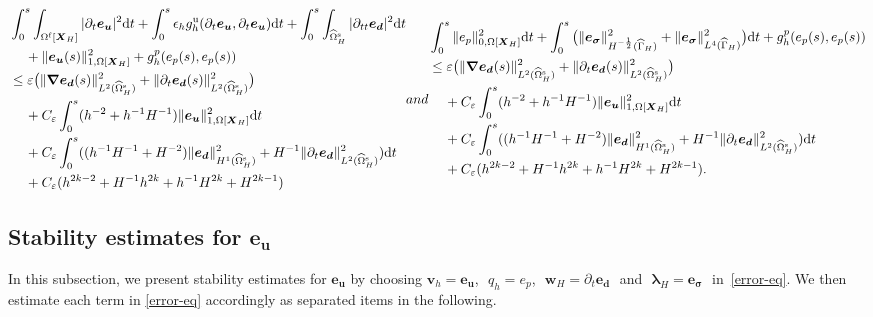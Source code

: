 \documentclass[11pt,reqno]{amsart}
\theoremstyle{definition}
\theoremstyle{plain}
\numberwithin{theorem}{section}
\numberwithin{proposition}{section}
\numberwithin{lemma}{section}
\numberwithin{equation}{section}
\newcommand{\bs}[1]{\boldsymbol{#1}}
\newcommand{\uu}[1]  {{\bs{#1}} }
\newcommand{\dep}{{{\bs{d}}}}
\newcommand{\grad}   { \uu{\nabla}    }
\def\d{\mathrm{d}}
\renewcommand{\(}{\bigl(}
\renewcommand{\)}{\bigr)}
\begin{document}
\begin{subequations}\label{ep-esigma-estimates}
\begin{align} 
& \int_0^s \int_{\Omega^{\rm f}[\bs X_H]} |\partial_t {\bs e}_{\bs u} |^2 \d t
+ \int_0^s \epsilon_h g_h^{\rm u} (\partial_t{\bs e}_{\bs u}, \partial_t{\bs e}_{\bs u}) \d t 
+ \int_0^s\int_{\widehat{\Omega}^{\rm s}_H} |\partial_{tt} {\bs e}_{\dep} |^2 \d t \notag\\
&\quad\,
+\|{\bs e}_{\bs u}(s)\|_{1,\Omega[{\bs X}_H]}^2 
+ g^p_h(e_p(s),e_p(s))\notag\\
&
\le 
\varepsilon
\big( \|\grad{\bs e}_{\bs d}(s)\|_{L^2(\widehat\Omega^{\rm s}_H)}^2 + \|\partial_t{\bs e}_{\bs d}(s)\|_{L^2(\widehat\Omega^{\rm s}_H)}^2 \big)\notag\\
&\quad\, 
+ C_\varepsilon \int_0^s (h^{-2}+h^{-1}H^{-1})\| {\bs e}_{\bs u}  \|_{1,\Omega[{\bs X}_H]}^2  \d t \notag\\
&\quad\, 
+ C_\varepsilon \int_0^s ((h^{-1}H^{-1}+H^{-2})\|{\bs e}_\dep\|_{H^1(\widehat{\Omega}^{\rm s}_H)}^2 +H^{-1}\|\partial_t{\bs e}_\dep\|_{L^2(\widehat{\Omega}^{\rm s}_H)}^2) \d t \notag\\
&\quad\, 
+ C_\varepsilon (h^{2k-2} + H^{-1}h^{2k} + h^{-1}H^{2k} + H^{2k-1}) 
\end{align}
and
\begin{align} \label{ep-esigma-estimates-L4}
& \int_0^s \| e_p \|_{0,\Omega[{\bs X}_H]}^2 \d t
+ \int_0^s \big( \| {\bs e}_{{\bs \sigma} } \|_{H^{-\frac12}(\widehat\Gamma_H)}^2 + \| {\bs e}_{\bs\sigma} \|_{L^4(\widehat\Gamma_H)}^2 \big) \d t  + g^p_h(e_p(s),e_p(s)) \notag\\
&
\le 
\varepsilon
\big( \|\grad{\bs e}_{\bs d}(s)\|_{L^2(\widehat\Omega^{\rm s}_H)}^2 + \|\partial_t{\bs e}_{\bs d}(s)\|_{L^2(\widehat\Omega^{\rm s}_H)}^2 \big)\notag\\
&\quad\, 
+ C_\varepsilon \int_0^s (h^{-2}+h^{-1}H^{-1})\| {\bs e}_{\bs u}  \|_{1,\Omega[{\bs X}_H]}^2  \d t \notag\\
&\quad\, 
+ C_\varepsilon \int_0^s ((h^{-1}H^{-1}+H^{-2})\|{\bs e}_\dep\|_{H^1(\widehat{\Omega}^{\rm s}_H)}^2 +H^{-1}\|\partial_t{\bs e}_\dep\|_{L^2(\widehat{\Omega}^{\rm s}_H)}^2) \d t \notag\\
&\quad\, 
+ C_\varepsilon (h^{2k-2} + H^{-1}h^{2k} + h^{-1}H^{2k} + H^{2k-1}) .
\end{align}
\end{subequations}


\subsection{Stability estimates for \texorpdfstring{${\bs e}_{\bs u}$}{x}}
In this subsection, we present stability estimates for ${\bs e}_{\bs u}$ by choosing ${\bs v}_h={\bs e}_{\bs u}$,\,\, $q_h=e_p$,\,\, ${\bs w}_H = \partial_t{\bs e}_\dep$\,\, and\,\, ${\bs \lambda}_H ={\bs e}_{{\bs \sigma} }$\,\, in\, \eqref{error-eq}. We then estimate each term in \eqref{error-eq} accordingly as separated items in the following. 
\end{document}
